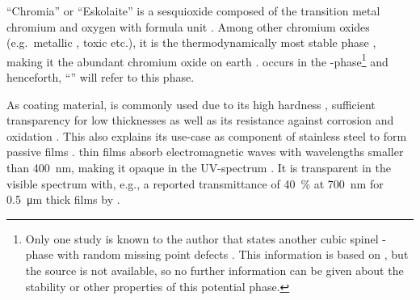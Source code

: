 
\enquote{Chromia} or \enquote{Eskolaite} is a sesquioxide composed of the transition metal chro\-mi\-um and oxygen with formula unit .
Among other chromium oxides (e.g.\ metallic , toxic  etc.), it is the thermodynamically most stable phase 
    \cite{robbert1998,al-kuhaili2007,lebreau2014},
making it the abundant chromium oxide on earth
    \cite{mi2018}.
 occurs in the \textalpha-phase\footnote{
    Only one study is known to the author that states another cubic spinel \textgamma-phase with random missing  point defects
        \cite{robbert1998}.
    This information is based on \textcite{wyckoff1963}, but the source is not available, so no further information can be given about the stability or other properties of this potential phase.
} and henceforth, \enquote{} will refer to this phase.

As coating material,  is commonly used due to its high hardness
    \cite{shackelford2000},
sufficient transparency for low thicknesses
    \cite{lai2003}
as well as its resistance against corrosion and oxidation
    \cite{nable2004}. 
This also explains its use-case as component of stainless steel to form passive films
    \cite{lebreau2014}.
 thin films absorb electromagnetic waves with wavelengths smaller than \qty{400}{\nm}, making it opaque in the \acrshort{UV}-spectrum \cite{cheng1996,guillen2021}.
It is transparent in the visible spectrum with, e.g., a reported transmittance of \qty{40}{\percent} at \qty{700}{\nm} for \qty{0.5}{\um} thick films by \textcite{cheng1996}.

